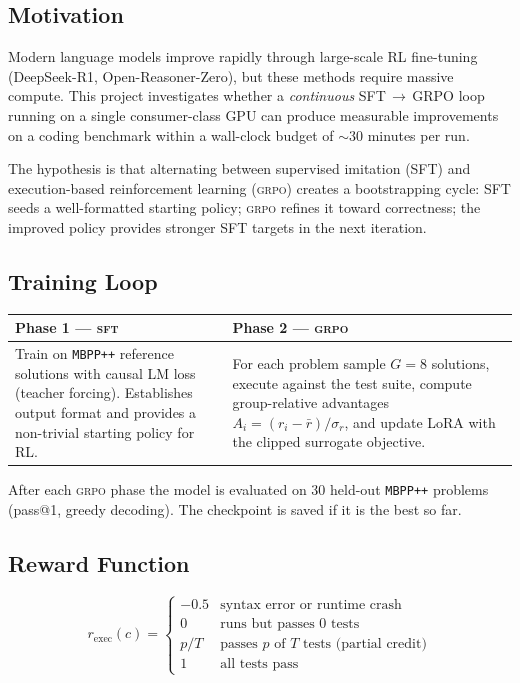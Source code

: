 \documentclass[11pt,a4paper]{article}
\newcommand{\dataset}{\texttt{MBPP++}}
\newcommand{\grpo}{\textsc{grpo}}
\newcommand{\sft}{\textsc{sft}}
\begin{document}
\subsection{Motivation}

Modern language models improve rapidly through large-scale RL fine-tuning
(DeepSeek-R1, Open-Reasoner-Zero), but these methods require massive compute.
This project investigates whether a \emph{continuous} SFT\,$\to$\,GRPO loop
running on a single consumer-class GPU can produce measurable improvements on a
coding benchmark within a wall-clock budget of $\sim$30 minutes per run.

The hypothesis is that alternating between supervised imitation (SFT) and
execution-based reinforcement learning (\grpo{}) creates a bootstrapping cycle:
SFT seeds a well-formatted starting policy; \grpo{} refines it toward
correctness; the improved policy provides stronger SFT targets in the next
iteration.

\subsection{Training Loop}

\begin{center}
\begin{tabular}{@{}p{}p{}@{}}
\toprule
\textbf{Phase 1 — \sft{}} & \textbf{Phase 2 — \grpo{}} \\
\midrule
Train on \dataset{} reference solutions with causal LM loss (teacher forcing).
Establishes output format and provides a non-trivial starting policy for RL.
&
For each problem sample $G{=}8$ solutions, execute against the test suite,
compute group-relative advantages $A_i = (r_i - \bar{r})/\sigma_r$, and
update LoRA with the clipped surrogate objective. \\
\bottomrule
\end{tabular}
\end{center}

After each \grpo{} phase the model is evaluated on 30 held-out \dataset{}
problems (pass@1, greedy decoding). The checkpoint is saved if it is the best
so far.

\subsection{Reward Function}

\[
  r_{\text{exec}}(c) =
  \begin{cases}
    -0.5 & \text{syntax error or runtime crash} \\
    0    & \text{runs but passes 0 tests} \\
    p/T  & \text{passes } p \text{ of } T \text{ tests (partial credit)} \\
    1    & \text{all tests pass}
  \end{cases}
\]
\end{document}
